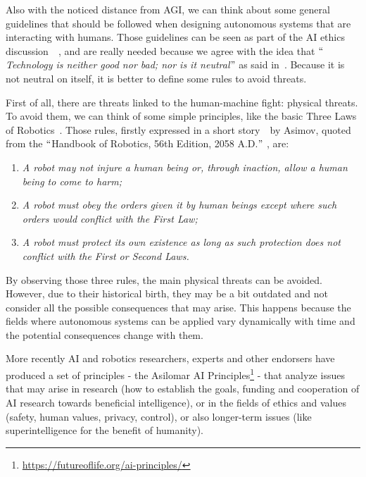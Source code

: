 Also with the noticed distance from AGI, we can think about some general guidelines that should be followed when designing autonomous systems that are interacting with humans. Those guidelines can be seen as part of the AI ethics discussion~\cite{hibbard2014ethical}~\cite{moor2009four}, and are really needed because we agree with the idea that $``$\textit{Technology is neither good nor bad; nor is it neutral}$"$  as said in~\cite{kranzberg1986technology}. Because it is not neutral on itself, it is better to define some rules to avoid threats.

First of all, there are threats linked to the human-machine fight: physical threats. To avoid them, we can think of some simple principles, like the basic Three Laws of Robotics~\cite{clarke2011asimov}. Those rules, firstly expressed in a short story~\cite{asimov1942runaround}\ by Asimov, quoted from  the $``$Handbook of Robotics, 56th Edition, 2058 A.D.$"$ , are:

\begin{enumerate}
	\item \textit{A robot may not injure a human being or, through inaction, allow a human being to come to harm;}

	\item \textit{A robot must obey the orders given it by human beings except where such orders would conflict with the First Law;}

	\item \textit{A robot must protect its own existence as long as such protection does not conflict with the First or Second Laws.}
\end{enumerate}

By observing those three rules, the main physical threats can be avoided. However, due to their historical birth, they may be a bit outdated and not consider all the possible consequences that may arise. This happens because the fields where autonomous systems can be applied vary dynamically with time and the potential consequences change with them.

More recently AI and robotics researchers, experts and other endorsers have produced a set of principles - the Asilomar AI Principles\footnote{\url{https://futureoflife.org/ai-principles/}} - that analyze issues that may arise in research (how to establish the goals, funding and cooperation of AI research towards beneficial intelligence), or in the fields of ethics and values (safety, human values, privacy, control), or also longer-term issues (like superintelligence for the benefit of humanity).

